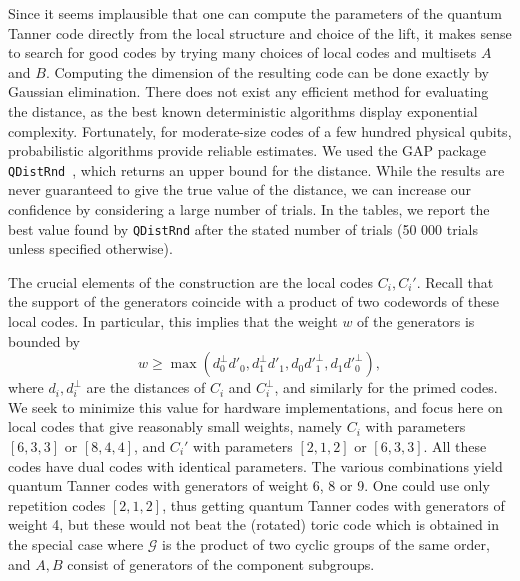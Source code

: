 \documentclass[a4paper,onecolumn,11pt]{quantumarticle}
\def\G{\mathcal{G}}
\begin{document}
Since it seems implausible that one can compute the parameters of the quantum Tanner code directly from the local structure and choice of the lift, it makes sense to search for good codes by trying many choices of local codes and multisets $A$ and $B$. 
Computing the dimension of the resulting code can be done exactly by Gaussian elimination. There does not exist any efficient method for evaluating the distance, as the best known deterministic algorithms display exponential complexity. Fortunately, for moderate-size codes of a few hundred physical qubits, probabilistic algorithms provide reliable estimates. We used the GAP package \texttt{QDistRnd}~\cite{QDistRnd,PSK22}, which returns an upper bound for the distance. While the results are never guaranteed to give the true value of the distance, we can increase our confidence by considering a large number of trials. In the tables, we report the best value found by \texttt{QDistRnd} after the stated number of trials (50 000 trials unless specified otherwise).




The crucial elements of the construction are the local codes $C_i, C_i'$. Recall that the support of the generators coincide with a product of two codewords of these local codes. In particular, this implies that the weight $w$ of the generators is bounded by
\[ w \geq \max (d_0^\perp d'_0, d^\perp_1 d'_1, d_0 d'^\perp_1, d_1 d'^\perp_0),\]
where $d_i, d_i^\perp$  are the distances of $C_i$ and $C^\perp_i$, and similarly for the primed codes.
We seek to minimize this value for hardware implementations, and focus here on local codes that give reasonably small weights, namely $C_i$ with parameters $[6,3,3]$ or $[8,4,4]$, and $C_i'$ with parameters $[2,1,2]$ or $[6,3,3]$. All these codes have dual codes with identical parameters. The various combinations yield quantum Tanner codes with generators of weight 6, 8 or 9.
One could use only repetition codes $[2,1,2]$, thus getting quantum Tanner codes with generators of weight 4, but these would not beat the (rotated) toric code which is obtained in the special case where $\G$ is the product of two cyclic groups of the same order, and $A, B$ consist of generators of the component subgroups. \\
\end{document}
